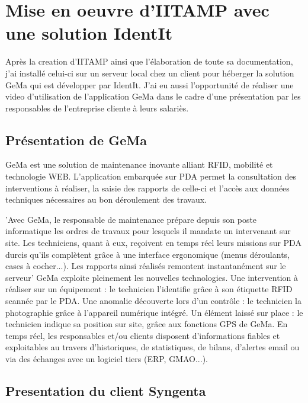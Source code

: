 \chapter{Mise en oeuvre d'IITAMP avec une solution IdentIt} %
\label{cha:Mise en oeuvre d'IITAMP avec une solution IdentIt}

\begin{it}
Après la creation d'IITAMP ainsi que l'élaboration de toute sa
documentation, j'ai installé celui-ci sur un serveur local chez un
client pour héberger la solution GeMa qui est développer par IdentIt.
J'ai eu aussi l'opportunité de réaliser une video d'utilisation de
l'application GeMa dans le cadre d'une présentation par les responsables
de l'entreprise cliente à leurs salariès.
\end{it}

\section{Présentation de GeMa} %
\label{sec:Présentation de GeMa}

GeMa est une solution de maintenance inovante alliant RFID, mobilité et
technologie WEB. L'application embarquée sur PDA permet la consultation
des interventions à réaliser, la saisie des rapports de celle-ci et
l'accès aux données techniques nécessaires au bon déroulement des
travaux.

'Avec GeMa, le responsable de maintenance prépare depuis son poste
informatique les ordres de travaux pour lesquels il mandate un
intervenant sur site. Les techniciens, quant à eux, reçoivent en temps
réel leurs missions sur PDA durcis qu'ils complètent grâce à une
interface ergonomique (menus déroulants, cases à cocher...). Les
rapports ainsi réalisés remontent instantanément sur le serveur' GeMa
exploite pleinement les nouvelles technologies. Une intervention à
réaliser sur un équipement : le technicien l'identifie grâce à son
étiquette RFID scannée par le PDA. Une anomalie découverte lors d'un
contrôle : le technicien la photographie grâce à l'appareil numérique
intégré. Un élément laissé sur place : le technicien indique sa position
sur site, grâce aux fonctions GPS de GeMa. En temps réel, les
responsables et/ou clients disposent d'informations fiables et
exploitables au travers d'historiques, de statistiques, de bilans,
d'alertes email ou via des échanges avec un logiciel tiers (ERP,
GMAO...).

\section{Presentation du client Syngenta} %
\label{sec:Presentation du client Syngenta}

